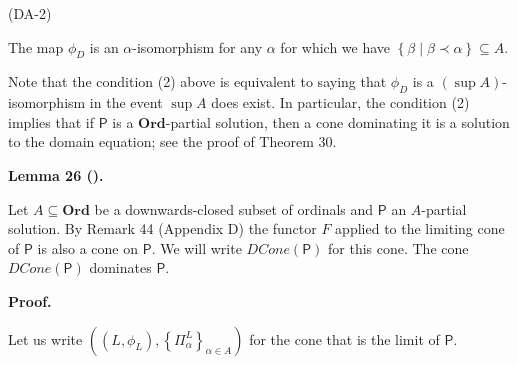 \documentclass[10pt,a4paper]{article}
\begin{document}
 
 
\par\noindent  (DA-2) 
 
The map $\phi_{D}$ is an $\alpha$-isomorphism for any $\alpha$ for which we have $\left\{\beta\middle|\beta\prec\alpha\right\}\subseteq A$.\par
 
 
  
 
 
 
Note that the condition (2) above is equivalent to saying that $\phi_{D}$ is a $(\sup{}A)$-isomorphism in the event $\sup{}A$ does exist. In particular, the condition (2) implies that if $\boldsymbol{\mathsf{P}}$ is a $\mathbf{Ord}$-partial solution, then a cone dominating it is a solution to the domain equation; see the proof of Theorem 30.\par
 
 
 
\par\medskip\noindent\textbf{Lemma 26 ().}\par
 
 
Let $A\subseteq\mathbf{Ord}$ be a downwards-closed subset of ordinals and $\boldsymbol{\mathsf{P}}$ an $A$-partial solution. By Remark 44 (Appendix D) the functor $F$ applied to the limiting cone of $\boldsymbol{\mathsf{P}}$ is also a cone on $\boldsymbol{\mathsf{P}}$. We will write $\mathit{DCone}(\boldsymbol{\mathsf{P}})$ for this cone. The cone $\mathit{DCone}(\boldsymbol{\mathsf{P}})$ dominates $\boldsymbol{\mathsf{P}}$.\par
 
 
 

 
\par\medskip\noindent\textbf{Proof.}\par
 
 
Let us write $((L,\phi_{L}),\left\{\Pi^{L}_{\alpha}\right\}_{\alpha\in A})$ for the cone that is the limit of $\boldsymbol{\mathsf{P}}$.\par
 
\end{document}
